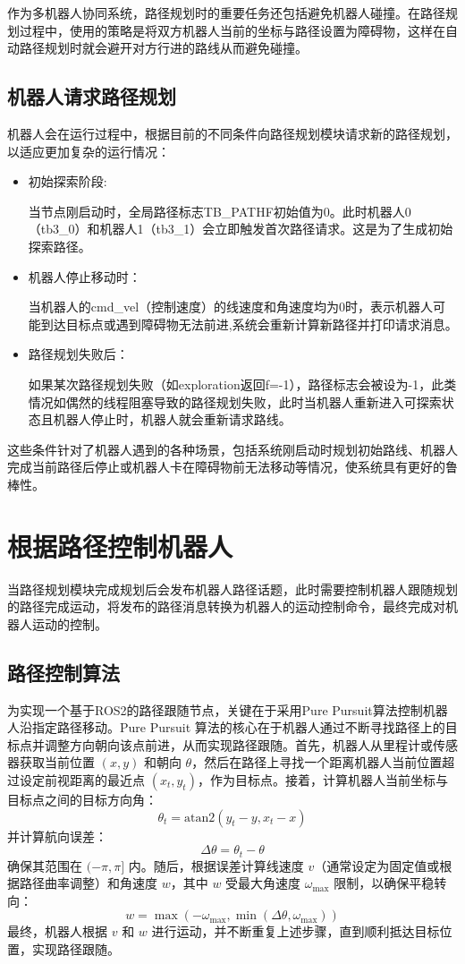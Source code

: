 作为多机器人协同系统，路径规划时的重要任务还包括避免机器人碰撞。在路径规划过程中，使用的策略是将双方机器人当前的坐标与路径设置为障碍物，这样在自动路径规划时就会避开对方行进的路线从而避免碰撞。

\subsection{机器人请求路径规划}
机器人会在运行过程中，根据目前的不同条件向路径规划模块请求新的路径规划，以适应更加复杂的运行情况：
\begin{itemize}

    \item 初始探索阶段:
    
        当节点刚启动时，全局路径标志TB\_PATHF初始值为0。此时机器人0（tb3\_0）和机器人1（tb3\_1）会立即触发首次路径请求。这是为了生成初始探索路径。

    \item 机器人停止移动时：
    
    当机器人的cmd\_vel（控制速度）的线速度和角速度均为0时，表示机器人可能到达目标点或遇到障碍物无法前进,系统会重新计算新路径并打印请求消息。

    \item 路径规划失败后：

    如果某次路径规划失败（如exploration返回f=-1），路径标志会被设为-1，此类情况如偶然的线程阻塞导致的路径规划失败，此时当机器人重新进入可探索状态且机器人停止时，机器人就会重新请求路线。

\end{itemize}

这些条件针对了机器人遇到的各种场景，包括系统刚启动时规划初始路线、机器人完成当前路径后停止或机器人卡在障碍物前无法移动等情况，使系统具有更好的鲁棒性。

\section{根据路径控制机器人}
当路径规划模块完成规划后会发布机器人路径话题，此时需要控制机器人跟随规划的路径完成运动，将发布的路径消息转换为机器人的运动控制命令，最终完成对机器人运动的控制。
\subsection{路径控制算法}
为实现一个基于ROS2的路径跟随节点，关键在于采用Pure Pursuit算法控制机器人沿指定路径移动。Pure Pursuit 算法的核心在于机器人通过不断寻找路径上的目标点并调整方向朝向该点前进，从而实现路径跟随。首先，机器人从里程计或传感器获取当前位置 $(x, y)$ 和朝向 $\theta$，然后在路径上寻找一个距离机器人当前位置超过设定前视距离的最近点 $(x_t, y_t)$，作为目标点。接着，计算机器人当前坐标与目标点之间的目标方向角：
\[
\theta_t = \text{atan2}(y_t - y, x_t - x)
\]
并计算航向误差：
\[
\Delta\theta = \theta_t - \theta
\]
确保其范围在 $(-\pi, \pi]$ 内。随后，根据误差计算线速度 $v$（通常设定为固定值或根据路径曲率调整）和角速度 $w$，其中 $w$ 受最大角速度 $\omega_{\max}$ 限制，以确保平稳转向：
\[
w = \max(-\omega_{\max}, \min(\Delta\theta, \omega_{\max}))
\]
最终，机器人根据 $v$ 和 $w$ 进行运动，并不断重复上述步骤，直到顺利抵达目标位置，实现路径跟随。


